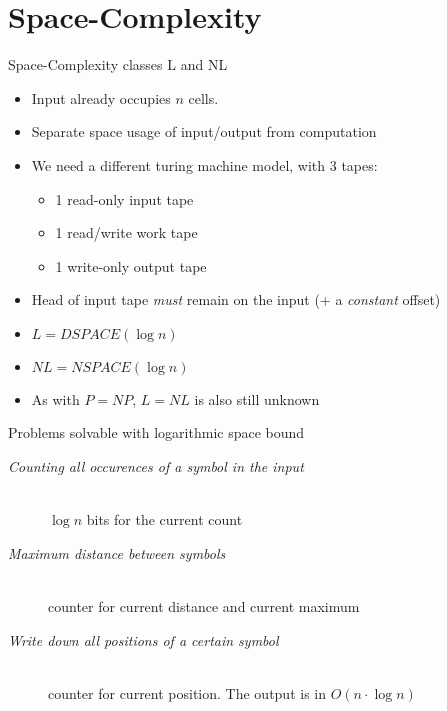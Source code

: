 \section{Space-Complexity}\label{space-complexity}

\begin{frame}{Space-Complexity classes L and NL}

\begin{itemize}
\item
  Input already occupies $n$ cells.
\item
  Separate space usage of input/output from computation
\item
  We need a different turing machine model, with 3 tapes:

  \begin{itemize}
  \itemsep1pt\parskip0pt
  \item
    1 read-only input tape
  \item
    1 read/write work tape
  \item
    1 write-only output tape
  \end{itemize}
\item
  Head of input tape \emph{must} remain on the input (+ a
  \emph{constant} offset)
\item
  $L = DSPACE(\log n)$
\item
  $NL = NSPACE(\log n)$
\item
  As with $P = NP$, $L = NL$ is also still unknown
\end{itemize}

\end{frame}

\begin{frame}{Problems solvable with logarithmic space bound}

\begin{description}
  \item[\textit{Counting all occurences of a symbol in the input}] \hfill \\
    $\log n$ bits for the current count
  \item[\textit{Maximum distance between symbols}] \hfill \\
    counter for current distance and current maximum
  \item[\textit{Write down all positions of a certain symbol}] \hfill \\
    counter for current position. The output is in $O(n \cdot \log n)$
\end{description}

\end{frame}

